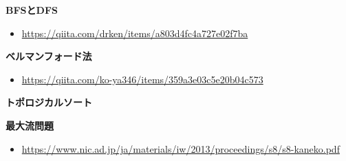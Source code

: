 \documentclass{jlreq}
\begin{document}
\textbf{BFSとDFS}
\begin{itemize}
    \item \url{https://qiita.com/drken/items/a803d4fc4a727e02f7ba}
\end{itemize}

\noindent \textbf{ベルマンフォード法}
\begin{itemize}
    \item \url{https://qiita.com/ko-ya346/items/359a3e03c5e20b04c573}
\end{itemize}

\noindent \textbf{トポロジカルソート}

\noindent \textbf{最大流問題}
\begin{itemize}
    \item \url{https://www.nic.ad.jp/ja/materials/iw/2013/proceedings/s8/s8-kaneko.pdf}
\end{itemize}
\end{document}
